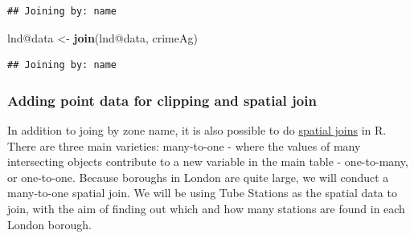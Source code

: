 \documentclass[]{article}
\newenvironment{Shaded}{}{}
\newcommand{\KeywordTok}[1]{\textcolor[rgb]{0.00,0.44,0.13}{\textbf{{#1}}}}
\newcommand{\DataTypeTok}[1]{\textcolor[rgb]{0.56,0.13,0.00}{{#1}}}
\newcommand{\StringTok}[1]{\textcolor[rgb]{0.25,0.44,0.63}{{#1}}}
\newcommand{\CommentTok}[1]{\textcolor[rgb]{0.38,0.63,0.69}{\textit{{#1}}}}
\newcommand{\NormalTok}[1]{{#1}}
\begin{document}
\begin{Shaded}
\end{Shaded}
\begin{verbatim}
## Joining by: name
\end{verbatim}
\begin{Shaded}
\begin{Highlighting}[]
\NormalTok{lnd@data <- }\KeywordTok{join}\NormalTok{(lnd@data, crimeAg)}
\end{Highlighting}
\end{Shaded}
\begin{verbatim}
## Joining by: name
\end{verbatim}
\subsubsection{Adding point data for clipping and spatial join}

In addition to joing by zone name, it is also possible to do
\href{http://help.arcgis.com/en/arcgisdesktop/10.0/help/index.html\#//00080000000q000000}{spatial
joins} in R. There are three main varieties: many-to-one - where the
values of many intersecting objects contribute to a new variable in the
main table - one-to-many, or one-to-one. Because boroughs in London are
quite large, we will conduct a many-to-one spatial join. We will be
using Tube Stations as the spatial data to join, with the aim of finding
out which and how many stations are found in each London borough.
\end{document}

